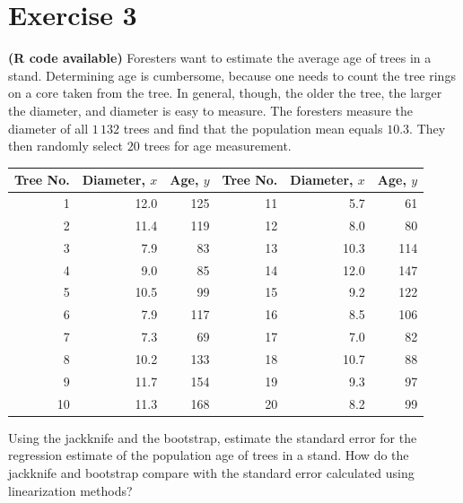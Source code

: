 \documentclass[12pt]{article}
\begin{document}
\section*{Exercise 3}
\textbf{\color{ForestGreen}(R code available)} Foresters want to estimate the average age of trees in a stand. Determining age is
cumbersome, because one needs to count the tree rings on a core taken from the
tree. In general, though, the older the tree, the larger the diameter, and diameter
is easy to measure. The foresters measure the diameter of all $1\,132$ trees and find
that the population mean equals $10.3$. They then randomly select $20$ trees for age
measurement.
\begin{center}
\begin{tabular}{rrrrrr}
Tree No. & Diameter, $x$ & Age, $y$& Tree No.& Diameter, $x$ &Age, $y$ \\
\hline
1& 12.0& 125 &11 &5.7 &61\\
2& 11.4& 119 &12& 8.0 &80\\
3& 7.9 &83 &13 &10.3& 114\\
4& 9.0 &85& 14 &12.0& 147\\
5& 10.5& 99& 15 &9.2 &122\\
6& 7.9 &117& 16 &8.5& 106\\
7& 7.3& 69 &17 &7.0& 82\\
8& 10.2& 133& 18& 10.7 &88\\
9& 11.7& 154 &19 &9.3 &97\\
10& 11.3& 168 &20& 8.2& 99\\
\end{tabular}
\end{center}
Using the jackknife and the bootstrap, estimate the standard error for the regression estimate of the
population age of trees in a stand. How
do the jackknife and bootstrap compare with the standard error calculated using linearization
methods? \\
\end{document}
